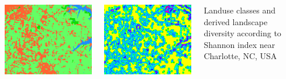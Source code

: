 \documentclass[25pt, margin=0mm, innermargin=15mm, blockverticalspace=15mm, colspace=15mm, subcolspace=8mm]{tikzposter}
\begin{document}
\begin{columns}
{\begin{minipage}{0.5\linewidth}
\includegraphics[width=\textwidth, trim={0 180 0 0}, clip]{diversity_classes}
\end{minipage}
\begin{minipage}{0.5\linewidth}
\includegraphics[width=\textwidth, trim={0 180 0 0}, clip]{diversity_shannon}
\end{minipage}

\vspace*{1ex}

Landuse classes and derived landscape diversity according to Shannon index near Charlotte, NC, USA
}




\end{columns}
\end{document}

